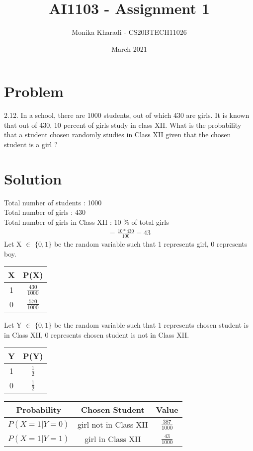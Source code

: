 \documentclass[journal,12pt,two column]{IEEEtran}
\title{AI1103 - Assignment 1}
\author{Monika Kharadi - CS20BTECH11026}
\date{March 2021}
\begin{document}
\maketitle
\section*{\large\textbf{Problem}}

2.12. In a school, there are 1000 students, out of which 430 are girls. It is known that out of 430, 10 percent of girls study in class XII. What is the probability that a student chosen randomly studies in Class XII given that the chosen student is a girl ?
{\section*{\large\textbf{Solution}}}
Total number of students : 1000 \\
Total number of girls : 430  \\
Total number of girls in Class XII : 10 \% of total girls 
\begin{align}
=\frac{10*430}{100}=43
\end{align}
Let X $\in$ $\{0,1\}$ be the random variable such that 1 represents girl, 0 represents boy.\\
\begin{center}
\begin{tabular}{|c|c|}
    \hline
    X & P(X) \\
    \hline
    1 & $\frac{430}{1000}$\\
    \hline
    0 & $\frac{570}{1000}$\\
    \hline
    \end{tabular}
\end{center}
Let Y $\in$ $\{0,1\}$ be the random variable such that 1 represents chosen student is in Class XII, 0 represents chosen student is not in Class XII.
\begin{center}
    \begin{tabular}{|c|c|}
    \hline
    Y & P(Y)\\
    \hline
    1 & $\frac{1}{2}$ \\
    \hline
    0 & $\frac{1}{2}$\\
    \hline
    \end{tabular}
\end{center} 
\begin{center}
    \begin{tabular}{|c|c|c|}
    \hline
    Probability & Chosen Student & Value\\
    \hline
    $P(X=1\vert Y=0)$ & girl not in Class XII & $\frac{387}{1000}$\\
    \hline
    $ P(X=1\vert Y=1)$ & girl in Class XII & $\frac{43}{1000}$ \\
    \hline
    \end{tabular}
\end{center} \\ 
\end{document}
